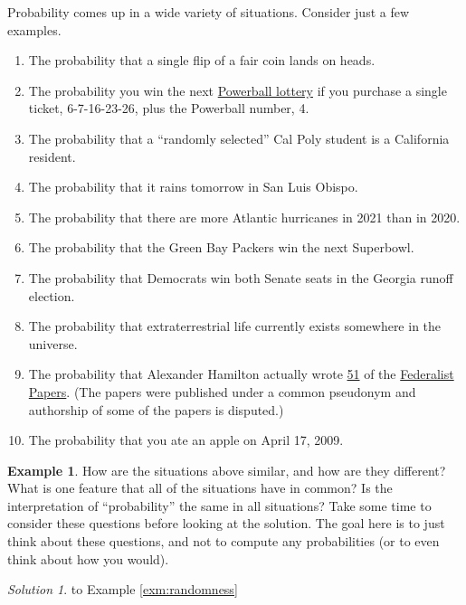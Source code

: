 \documentclass[
]{book}
\providecommand{\tightlist}{%
  \setlength{\itemsep}{0pt}\setlength{\parskip}{0pt}}
\theoremstyle{definition}
\theoremstyle{definition}
\newtheorem{example}{Example}[chapter]
\theoremstyle{definition}
\theoremstyle{remark}
\newtheorem*{solution}{Solution}
\begin{document}
Probability comes up in a wide variety of situations. Consider just a few examples.

\begin{enumerate}
\def\labelenumi{\arabic{enumi}.}
\tightlist
\item
  The probability that a single flip of a fair coin lands on heads.
\item
  The probability you win the next \href{https://www.powerball.com/}{Powerball lottery} if you purchase a single ticket, 6-7-16-23-26, plus the Powerball number, 4.
\item
  The probability that a ``randomly selected'' Cal Poly student is a California resident.
\item
  The probability that it rains tomorrow in San Luis Obispo.
\item
  The probability that there are more Atlantic hurricanes in 2021 than in 2020.
\item
  The probability that the Green Bay Packers win the next Superbowl.
\item
  The probability that Democrats win both Senate seats in the Georgia runoff election.
\item
  The probability that extraterrestrial life currently exists somewhere in the universe.
\item
  The probability that Alexander Hamilton actually wrote \href{https://www.youtube.com/watch?v=DPgE7PNzXag}{51} of the \href{https://en.wikipedia.org/wiki/The_Federalist_Papers}{Federalist Papers}. (The papers were published under a common pseudonym and authorship of some of the papers is disputed.)
\item
  The probability that you ate an apple on April 17, 2009.
\end{enumerate}

\begin{example}
\protect\hypertarget{exm:randomness}{}{\label{exm:randomness} }
How are the situations above similar, and how are they different? What is one feature that all of the situations have in common? Is the interpretation of ``probability'' the same in all situations? Take some time to consider these questions before looking at the solution. The goal here is to just think about these questions, and not to compute any probabilities (or to even think about how you would).
\end{example}

\begin{solution}
{}to Example \ref{exm:randomness}
\end{solution}
\end{document}
